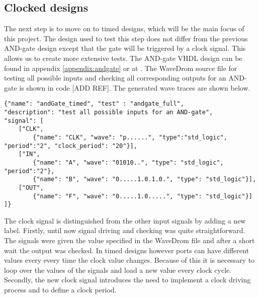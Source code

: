 \subsection{Clocked designs}
The next step is to move on to timed designs, which will be the main focus of this project. The design used to test this step does not differ from the previous AND-gate design except that the gate will be triggered by a clock signal. This allows us to create more extensive tests. The AND-gate VHDL design can be found in appendix \ref{appendix:andgate} or at \cite{examples}.
\npar
The WaveDrom source file for testing all possible inputs and checking all corresponding outputs for an AND-gate is shown in code [ADD REF]. The generated wave traces are shown below.
\begin{lstlisting}[style=json, caption={JSON source file for a full AND-gate test}, label={json:andgate_full}]
{"name": "andGate_timed", "test" : "andgate_full", 
"description": "test all possible inputs for an AND-gate", 
"signal": [
	["CLK",
		{"name": "CLK", "wave": "p......", "type":"std_logic", "period":"2", "clock_period": "20"}],
	["IN",
		{"name": "A", "wave": "01010..", "type": "std_logic", "period":"2"},
		{"name": "B", "wave": "0.....1.0.1.0.", "type": "std_logic"}],
	["OUT",
		{"name": "F", "wave": "0.....1.0.....", "type": "std_logic"}]
]}
\end{lstlisting}\nline
{}\nline
The clock signal is distinguished from the other input signals by adding a new label.
\npar
Firstly, until now signal driving and checking was quite straightforward. The signals were given the value specified in the WaveDrom file and after a short wait the output was checked. In timed designs however ports can have different values every every time the clock value changes. Because of this it is necessary to loop over the values of the signals and load a new value every clock cycle.
\npar
Secondly, the new clock signal introduces the need to implement a clock driving process and to define a clock period. 

